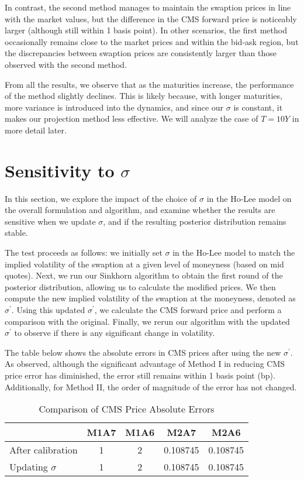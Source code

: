 In contrast, the second method manages to maintain the swaption prices in line with the market values, 
but the difference in the CMS forward price is noticeably larger (although still within 1 basis point). 
In other scenarios, the first method occasionally remains close to the market prices and within the bid-ask region, 
but the discrepancies between swaption prices are consistently larger than those observed with the second method.



From all the results, we observe that as the maturities increase, the performance of the method slightly declines. This is likely because, with longer maturities, more variance is introduced into the dynamics, and since our \(\sigma\) is constant, it makes our projection method less effective. We will analyze the case of \(T = 10Y\) in more detail later.

\section{Sensitivity to \(\sigma\)}
In this section, we explore the impact of the choice of \(\sigma\) in the Ho-Lee model on the overall formulation and algorithm, and examine whether the results are sensitive when we update \(\sigma\), and if the resulting posterior distribution remains stable.

The test proceeds as follows: we initially set \(\sigma\) in the Ho-Lee model to match the implied volatility of the swaption at a given level of moneyness (based on mid quotes). Next, we run our Sinkhorn algorithm to obtain the first round of the posterior distribution, allowing us to calculate the modified prices. We then compute the new implied volatility of the swaption at the moneyness, denoted as \(\sigma^{'}\). Using this updated \(\sigma^{'}\), we calculate the CMS forward price and perform a comparison with the original. Finally, we rerun our algorithm with the updated \(\sigma^{'}\) to observe if there is any significant change in volatility.

The table below shows the absolute errors in CMS prices after using the new \(\sigma^{'}\). As observed, although the significant advantage of Method I in reducing CMS price error has diminished, the error still remains within 1 basis point (bp). Additionally, for Method II, the order of magnitude of the error has not changed.

\begin{table}[h]
    \centering
    \begin{tabular}{lcccc}
        \hline
         & M1A7 & M1A6 & M2A7 & M2A6 \\
        \hline
        After calibration & 1 & 2 & 0.108745 & 0.108745 \\
        \hline
        Updating \(\sigma\) & 1 & 2 & 0.108745 & 0.108745 \\
        \hline
    \end{tabular}
    \caption{Comparison of CMS Price Absolute Errors}
    \label{table}
\end{table}

